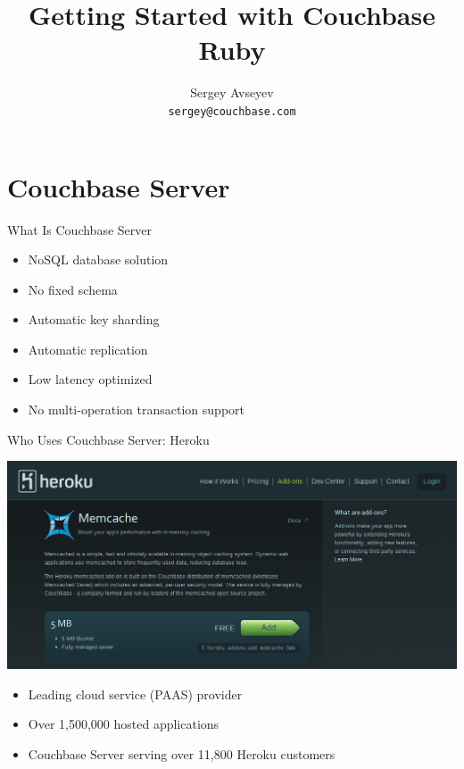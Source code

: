 \documentclass[aspectratio=43,handout]{beamer}
\title{Getting Started with Couchbase Ruby}
\author{Sergey Avseyev\\\texttt{sergey@couchbase.com}}
\begin{document}
\titleback
\begin{frame}
  \titlepage
\end{frame}

\section{Couchbase Server}
\begin{frame}{What Is Couchbase Server}
  \begin{itemize}
    \pause \item NoSQL database solution
    \pause \item No fixed schema
    \pause \item Automatic key sharding
    \pause \item Automatic replication
    \pause \item Low latency optimized
    \pause \item No multi-operation transaction support
  \end{itemize}
\end{frame}
\begin{frame}{Who Uses Couchbase Server: Heroku}
  \begin{center}
    \includegraphics[scale=0.18]{figures/heroku.png}
  \end{center}
  \begin{itemize}
    \item Leading cloud service (PAAS) provider
    \item Over 1,500,000 hosted applications
    \item Couchbase Server serving over 11,800 Heroku customers
  \end{itemize}
\end{frame}
\end{document}
